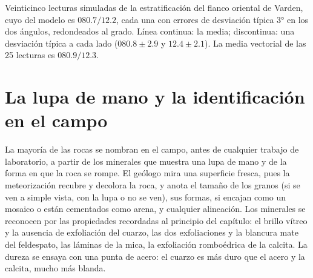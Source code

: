 \begin{omfigure}

{\small Veinticinco lecturas simuladas de la estratificación del flanco oriental de Varden, cuyo 
del modelo es $080.7/12.2$, cada una con errores de desviación típica \ang{3} en los dos ángulos, redondeados
al grado. Línea continua: la media; discontinua: una desviación típica a cada lado ($080.8 \pm 2.9$ y
$12.4 \pm 2.1$). La media vectorial de las 25 lecturas es $080.9/12.3$.}
\end{omfigure}

\section{La lupa de mano y la identificación en el campo}

La mayoría de las rocas se nombran en el campo, antes de cualquier trabajo de laboratorio, a partir de los
minerales que muestra una lupa de mano y de la forma en que la roca se rompe. El geólogo mira una superficie
fresca, pues la meteorización recubre y decolora la roca, y anota el tamaño de los granos (si se ven a simple
vista, con la lupa o no se ven), sus formas, si encajan como un mosaico o están cementados como arena, y
cualquier alineación. Los minerales se reconocen por las propiedades recordadas al principio del capítulo: el
brillo vítreo y la ausencia de exfoliación del cuarzo, las dos exfoliaciones y la blancura mate del feldespato,
las láminas de la mica, la exfoliación romboédrica de la calcita. La dureza se ensaya con una punta de acero:
el cuarzo es más duro que el acero y la calcita, mucho más blanda.

